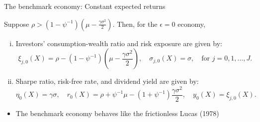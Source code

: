 \documentclass[12pt,aspectratio=169]{beamer}
\newenvironment{wideitemize}{\itemize\addtolength{\itemsep}{10pt}}{\enditemize}
\begin{document}
\begin{frame}{The benchmark economy: Constant expected returns}
    \begin{small}
        \begin{lemma}
        Suppose $\rho>(1-\psi^{-1})\left( \mu - \frac{\gamma\sigma^2}{2}  \right)$. Then, for the $\epsilon=0$ economy, \begin{enumerate}[(i)]
        \item Investors' consumption-wealth ratio and risk exposure are given by:
        \begin{equation*}
            \xi_{j,0}(X) = \rho - (1-\psi^{-1}) \left( \mu - \frac{\gamma \sigma^2}{2} \right), \quad \sigma_{j,0}(X) = \sigma, \quad \text{for } j = 0,1,\ldots, J.
        \end{equation*}
        \item Sharpe ratio, risk-free rate, and dividend yield are given by:
        \begin{equation*}
            \eta_0 (X) = \gamma \sigma, \quad 
            r_0(X) = \rho + \psi^{-1} \mu - (1+\psi^{-1}) \frac{\gamma \sigma^2}{2}, \quad 
            y_0(X) =  \xi_{j,0}(X).
        \end{equation*}
        \end{enumerate}
    \end{lemma}
    \end{small}
    \vspace{-2mm}
    \begin{itemize}
        \item The benchmark economy behaves like the frictionless Lucas (1978)
    \end{itemize}
\end{frame}
\end{document}
